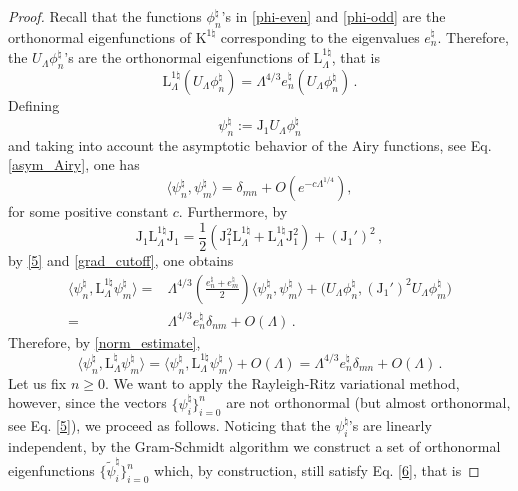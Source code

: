 \documentclass[a4paper,11pt,reqno]{amsart}
\theoremstyle{definition}
\numberwithin{equation}{section}
\newcommand{\Lrm}{\mathrm{L}}
\newcommand{\bosfer}{{\natural}}
\begin{document}
\begin{proof}
Recall that the functions $\phi^{\bosfer}_{n}$'s in \eqref{phi-even} and \eqref{phi-odd} are the orthonormal  eigenfunctions of  $\mathrm{K}^{1\bosfer}$ corresponding to the  eigenvalues $e^\bosfer_{n}$. Therefore, the $U_{\Lambda}\phi^{\bosfer}_{n}$'s are the orthonormal  eigenfunctions of  $\Lrm^{1\bosfer}_\Lambda$, that is
\begin{equation*}%
\Lrm^{1\bosfer}_\Lambda \left(U_{\Lambda}\phi^{\bosfer}_{n}\right) = \Lambda^{4/3} e^\bosfer_{n} \left(U_{\Lambda}\phi^{\bosfer}_{n}\right) \, .
\end{equation*}
Defining
\begin{equation*}
        \psi^{\bosfer}_n := \mathrm{J_1} U_{\Lambda}\phi^{\bosfer}_{n} 
    \end{equation*}
and taking into account the asymptotic behavior of the Airy functions, see Eq.  \eqref{asym_Airy}, one has
    \begin{equation}\label{5}
        \langle \psi^{\bosfer}_n ,\psi^{\bosfer}_m \rangle = \delta_{mn} + O(e^{-c\Lambda^{1/4}}) ,
    \end{equation}
    for some positive constant $c$. 
Furthermore, by 
\[
\mathrm{J_1}\Lrm^{1\bosfer}_\Lambda\mathrm{J_1} = \frac12 \left( \mathrm{J_1^2}\Lrm^{1\bosfer}_\Lambda + \Lrm^{1\bosfer}_\Lambda \mathrm{J_1^2}\right) + (\mathrm{J_1'})^2\,,
\] 
by \eqref{5} and \eqref{grad_cutoff}, one obtains
\begin{equation}\begin{aligned}\label{6}
        \langle \psi^{\bosfer}_n ,\Lrm^{1\bosfer}_\Lambda \psi^{\bosfer}_m \rangle =& \Lambda^{4/3} \left(\frac{e^\bosfer_{n} + e^{\bosfer}_{m}}{2}\right) \langle\psi^{\bosfer}_n ,\psi^{\bosfer}_m \rangle + \big( U_{\Lambda}\phi^{\bosfer}_{n} ,\left(\mathrm{J_1'}\right)^2U_{\Lambda}\phi^{\bosfer}_{m} \big) \\ =& \Lambda^{4/3} e^\bosfer_{n}\delta_{nm} + O(\Lambda)\, .
        \end{aligned}
    \end{equation}
Therefore, by \eqref{norm_estimate},   
    \begin{equation*}%
    \langle \psi^{\bosfer}_n ,\Lrm_\Lambda^\bosfer\psi^{\bosfer}_m \rangle  = \langle \psi^{\bosfer}_n ,\Lrm^{1\bosfer}_\Lambda  \psi^{\bosfer}_m \rangle + O\left(\Lambda\right) 
         =  \Lambda^{4/3} e^\bosfer_{n} \delta_{mn} + O(\Lambda)\, .
    \end{equation*}
Let us fix $n \ge 0$. We want to apply the Rayleigh-Ritz variational method, however, since the vectors $\{\psi^{\bosfer}_i\}_{i=0}^n$ are not orthonormal (but almost orthonormal, see Eq. \eqref{5}), we proceed as follows. Noticing that  the $\psi_i^{\bosfer}$'s are linearly independent, by the Gram-Schmidt algorithm  we  construct a set of orthonormal eigenfunctions $\{\tilde \psi_i^{\bosfer}\}_{i=0}^n$ which, by construction, still satisfy Eq. \eqref{6}, that is   

\end{proof}
\end{document}
